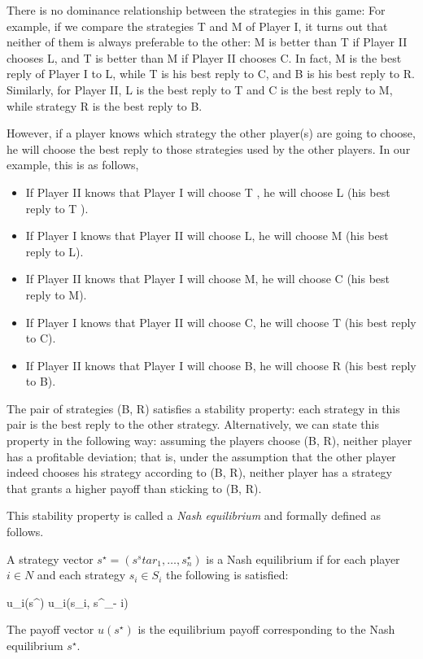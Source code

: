 There is no dominance relationship between the strategies in this game: For example, if we compare the strategies T and M of Player I, it turns out that neither of them is always preferable to the other: M is better than T if Player II chooses L, and T is better than M if Player II chooses C. In fact, M is the best reply of Player I to L, while T is his best reply to C, and B is his best reply to R. Similarly, for Player II, L is the best reply to T and C
is the best reply to M, while strategy R is the best reply to B.

However, if a player knows which strategy the other player(s) are going to choose, he will choose the best reply to those strategies used by the other players. In our example, this is as follows,

\begin{itemize}
	\item If Player II knows that Player I will choose T , he will choose L (his best reply to T ).
	\item If Player I knows that Player II will choose L, he will choose M (his best reply to L).
	\item If Player II knows that Player I will choose M, he will choose C (his best reply to M).
	\item If Player I knows that Player II will choose C, he will choose T (his best reply to C).
	\item If Player II knows that Player I will choose B, he will choose R (his best reply to B).
\end{itemize}

The pair of strategies (B, R) satisfies a stability property: each strategy in this pair is the best reply to the other strategy. Alternatively, we can state this property in the following way: assuming the players choose (B, R), neither player has a profitable deviation; that is, under the assumption that the other player indeed chooses his strategy according to (B, R), neither player has a strategy that grants a higher payoff than sticking to (B, R).

This stability property is called a \emph{Nash equilibrium} and formally defined as follows.

\begin{definition}
	A strategy vector $s^\star = (s^star_1, \ldots, s^\star_n)$ is a Nash equilibrium if for each player $i \in N$ and each strategy $s_i \in S_i$ the following is satisfied:
	
	\bee
		u_i(s^\star) \geq u_i(s_i, s^\star_{- i})
	\eee

	The payoff vector $u(s^\star)$ is the equilibrium payoff corresponding to the Nash equilibrium $s^\star$.
\end{definition}

